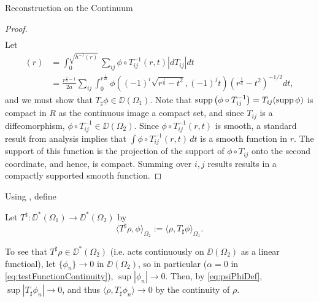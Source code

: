 \begin{chapter}{Reconstruction on the Continuum}
\begin{proof}
\begin{align}
  \end{align}
  Let 
  \begin{align}
    [T_\sharp\phi](r) 
      &= \int_0^{\sqrt{h^{-1}(r)}} \sum_{ij}\phi \circ T_{ij}^{-1}(r,t)\left|dT_{ij}\right|dt \\
      &= \frac{r^{\frac 1a -1} }{2a}\sum_{ij}\int_0^{r^{\frac{1}{2a}}} \phi \left((-1)^i\sqrt{r^{\frac 1a} - t^2}, (-1)^jt\right) \left( r^{\frac 1a} - t^2 \right)^{-1/2} dt, \label{eq:psiPhiDef}
  \end{align}
  and we must show that $T_\sharp\phi \in \DD(\Omega_1)$.
  Note that $\operatorname*{supp} \left(\phi \circ T_{ij}^{-1} \right) = T_{ij}( \operatorname*{supp} \phi )$ is compact in $R$ as the continuous image a compact set, and since $T_{ij}$ is a diffeomorphism, $\phi \circ T_{ij}^{-1} \in \DD(\Omega_2)$. 
  Since $\phi\circ T_{ij}^{-1}(r,t)$ is smooth, a standard result from analysis \cite[pg. 433]{strichartz2000} implies that $\int \phi \circ T_{ij}^{-1}(r,t)\,dt$ is a smooth function in $r$.  
  The support of this function is the projection of the support of $\phi\circ T_{ij}$ onto the second coordinate, and hence, is compact.
  Summing over $i,j$ results results in a compactly supported smooth function.

\end{proof}

  Using , define
  \begin{defn}
    Let $T^\sharp:\DD^*(\Omega_1) \to \DD^*(\Omega_2)$ by
  \begin{equation}
    \langle T^\sharp \rho, \phi \rangle_{\Omega_2} := \langle \rho, T_\sharp\phi\rangle_{\Omega_1}.
  \end{equation}
  \end{defn}
  To see that $T^\sharp \rho \in \DD^*(\Omega_2)$ (i.e. acts continuously on $\DD(\Omega_2)$ as a linear functioal), let $\{\phi_n\} \to 0$ in $\DD(\Omega_2)$, so in particular ($\alpha = 0$ in \eqref{eq:testFunctionContinuity}), $\sup|\phi_n| \to 0$. 
  Then, by \eqref{eq:psiPhiDef}, $\sup |T_\sharp\phi_n| \to 0$, and thus $\langle \rho, T_\sharp\phi_n\rangle \to 0$ by the continuity of $\rho$. 


\end{chapter}
